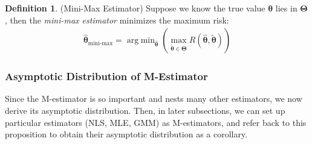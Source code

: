 \documentclass[12pt]{article}
\theoremstyle{plain}
\theoremstyle{definition}
\newtheorem{defn}[thm]{Definition}
\theoremstyle{remark}
\newcommand{\bstheta}{\boldsymbol{\theta}}
\newcommand{\bsTheta}{\boldsymbol{\Theta}}
\newcommand{\bshattheta}{\boldsymbol{\hat{\theta}}}
\newcommand{\bstildetheta}{\boldsymbol{\tilde{\theta}}}
\DeclareMathOperator*{\argmin}{arg\;min}
\begin{document}
\begin{defn}(Mini-Max Estimator)
Suppose we know the true value $\bstheta$ lies in $\bsTheta$, then
the \emph{mini-max estimator} minimizes the maximum risk:
\begin{align*}
  \bshattheta_{\text{mini-max}}
  =
  \argmin_{\bshattheta}
  \left(
  \max_{\bstildetheta \in \bsTheta}
  R(\bshattheta,\bstildetheta)
  \right)
\end{align*}
\end{defn}

\clearpage
\subsubsection{Asymptotic Distribution of M-Estimator}

Since the M-estimator is so important and nests many other estimators,
we now derive its asymptotic distribution.
Then, in later subsections, we can set up particular estimators (NLS,
MLE, GMM) as M-estimators, and refer back to this proposition to obtain
their asymptotic distribution as a corollary.
\end{document}
